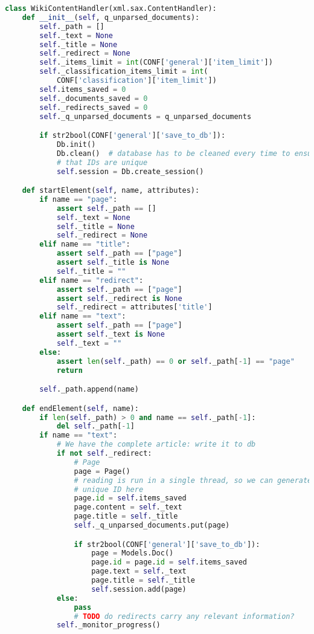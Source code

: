 \begin{lstlisting}[language=Python, caption=XML parser]
class WikiContentHandler(xml.sax.ContentHandler):
    def __init__(self, q_unparsed_documents):
        self._path = []
        self._text = None
        self._title = None
        self._redirect = None
        self._items_limit = int(CONF['general']['item_limit'])
        self._classification_items_limit = int(
            CONF['classification']['item_limit'])
        self.items_saved = 0
        self._documents_saved = 0
        self._redirects_saved = 0
        self._q_unparsed_documents = q_unparsed_documents

        if str2bool(CONF['general']['save_to_db']):
            Db.init()
            Db.clean()  # database has to be cleaned every time to ensure
            # that IDs are unique
            self.session = Db.create_session()

    def startElement(self, name, attributes):
        if name == "page":
            assert self._path == []
            self._text = None
            self._title = None
            self._redirect = None
        elif name == "title":
            assert self._path == ["page"]
            assert self._title is None
            self._title = ""
        elif name == "redirect":
            assert self._path == ["page"]
            assert self._redirect is None
            self._redirect = attributes['title']
        elif name == "text":
            assert self._path == ["page"]
            assert self._text is None
            self._text = ""
        else:
            assert len(self._path) == 0 or self._path[-1] == "page"
            return

        self._path.append(name)

    def endElement(self, name):
        if len(self._path) > 0 and name == self._path[-1]:
            del self._path[-1]
        if name == "text":
            # We have the complete article: write it to db
            if not self._redirect:
                # Page
                page = Page()
                # reading is run in a single thread, so we can generate an
                # unique ID here
                page.id = self.items_saved
                page.content = self._text
                page.title = self._title
                self._q_unparsed_documents.put(page)

                if str2bool(CONF['general']['save_to_db']):
                    page = Models.Doc()
                    page.id = page.id = self.items_saved
                    page.text = self._text
                    page.title = self._title
                    self.session.add(page)
            else:
                pass
                # TODO do redirects carry any relevant information?
            self._monitor_progress()


\end{lstlisting}
